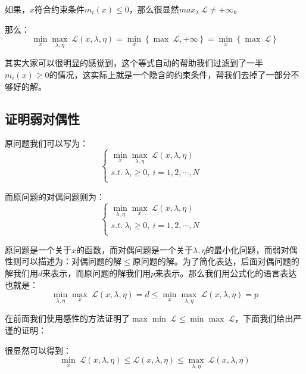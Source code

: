 \documentclass[a4paper]{article}
\begin{document}
如果，$x$符合约束条件$m_i(x) \leq 0$，那么很显然$max_{\lambda}\ \mathcal{L} \neq + \infty$。

那么：
\begin{equation}
    \min_{x} \max_{\lambda,\eta} \ \mathcal{L}(x,\lambda,\eta) = \min_{x}\left\{ \max\ \mathcal{L}, +\infty \right\} = \min_{x}\left\{ \max\ \mathcal{L} \right\}
\end{equation}

其实大家可以很明显的感觉到，这个等式自动的帮助我们过滤到了一半$m_i(x) \geq 0$的情况，这实际上就是一个隐含的约束条件，帮我们去掉了一部分不够好的解。

\subsection{证明弱对偶性}
原问题我们可以写为：
\begin{equation}
    \left\{
    \begin{array}{ll}
      \min_{x}\max_{\lambda,\eta}\  \mathcal{L}(x,\lambda,\eta) & \\
      s.t. \ \lambda_i \geq 0,\ i = 1,2,\cdots,N & \\
    \end{array}
    \right.
\end{equation}

而原问题的对偶问题则为：
\begin{equation}
    \left\{
    \begin{array}{ll}
      \min_{\lambda,\eta}\max_{x}\  \mathcal{L}(x,\lambda,\eta) & \\
      s.t. \ \lambda_i \geq 0,\ i = 1,2,\cdots,N & \\
    \end{array}
    \right.
\end{equation}

原问题是一个关于$x$的函数，而对偶问题是一个关于$\lambda,\eta$的最小化问题，而弱对偶性则可以描述为：对偶问题的解$\leq$原问题的解。为了简化表达，后面对偶问题的解我们用$d$来表示，而原问题的解我们用$p$来表示。那么我们用公式化的语言表达也就是：
\begin{equation}
     \min_{\lambda,\eta}\max_{x}\  \mathcal{L}(x,\lambda,\eta) = d \leq  \min_{x}\max_{\lambda,\eta}\  \mathcal{L}(x,\lambda,\eta) = p
\end{equation}

在前面我们使用感性的方法证明了$\max \min \ \mathcal{L} \leq \min \max \ \mathcal{L}$，下面我们给出严谨的证明：

很显然可以得到：
\begin{equation}
    \min_{x}\ \mathcal{L}(x,\lambda,\eta) \leq \mathcal{L}(x,\lambda,\eta) \leq \max_{\lambda,\eta}\ \mathcal{L}(x,\lambda,\eta)
\end{equation}
\end{document}
